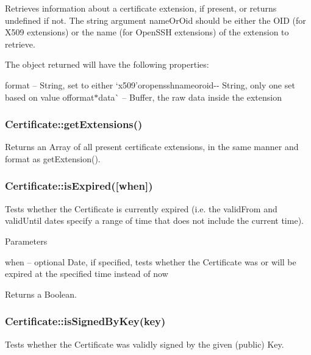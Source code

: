 Retrieves information about a certificate extension, if present, or returns {\ttfamily undefined} if not. The string argument {\ttfamily name\+Or\+Oid} should be either the O\+ID (for X509 extensions) or the name (for Open\+S\+SH extensions) of the extension to retrieve.

The object returned will have the following properties\+:


\begin{DoxyItemize}
\item {\ttfamily format} -- String, set to either `\textquotesingle{}x509'{\ttfamily or}\textquotesingle{}openssh\textquotesingle{}{\ttfamily  $\ast$}name{\ttfamily or}oid{\ttfamily -\/-\/ String, only one set based on value of}format{\ttfamily  $\ast$}data\`{} -- Buffer, the raw data inside the extension
\end{DoxyItemize}

\subsubsection*{{\ttfamily Certificate\+::get\+Extensions()}}

Returns an Array of all present certificate extensions, in the same manner and format as {\ttfamily get\+Extension()}.

\subsubsection*{{\ttfamily Certificate\+::is\+Expired(\mbox{[}when\mbox{]})}}

Tests whether the Certificate is currently expired (i.\+e. the {\ttfamily valid\+From} and {\ttfamily valid\+Until} dates specify a range of time that does not include the current time).

Parameters


\begin{DoxyItemize}
\item {\ttfamily when} -- optional Date, if specified, tests whether the Certificate was or will be expired at the specified time instead of now
\end{DoxyItemize}

Returns a Boolean.

\subsubsection*{{\ttfamily Certificate\+::is\+Signed\+By\+Key(key)}}

Tests whether the Certificate was validly signed by the given (public) Key.

